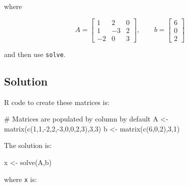 \documentclass[
  letterpaper,
]{book}
\newenvironment{Shaded}{\begin{snugshade}}{\end{snugshade}}
\newcommand{\CommentTok}[1]{\textcolor[rgb]{0.37,0.37,0.37}{#1}}
\newcommand{\DecValTok}[1]{\textcolor[rgb]{0.68,0.00,0.00}{#1}}
\newcommand{\FunctionTok}[1]{\textcolor[rgb]{0.28,0.35,0.67}{#1}}
\newcommand{\NormalTok}[1]{\textcolor[rgb]{0.00,0.23,0.31}{#1}}
\newcommand{\OtherTok}[1]{\textcolor[rgb]{0.00,0.23,0.31}{#1}}
\newcommand{\SpecialCharTok}[1]{\textcolor[rgb]{0.37,0.37,0.37}{#1}}
\begin{document}
where

\begin{equation*}
A = \left [ \begin{array}{rrr}
             1 &  2 & 0 \\
             1 & -3 & 2 \\
            -2 &  0 & 3
            \end{array} \right ], \qquad 
  b = \left[ \begin{matrix}6 \\ 0 \\ 2\end{matrix} \right ]
\end{equation*}

and then use \texttt{solve}.

\hypertarget{solution-1}{%
\subsection{Solution}\label{solution-1}}

R code to create these matrices is:

\begin{Shaded}
\begin{Highlighting}[]
\CommentTok{\# Matrices are populated by column by default}
\NormalTok{A }\OtherTok{\textless{}{-}} \FunctionTok{matrix}\NormalTok{(}\FunctionTok{c}\NormalTok{(}\DecValTok{1}\NormalTok{,}\DecValTok{1}\NormalTok{,}\SpecialCharTok{{-}}\DecValTok{2}\NormalTok{,}\DecValTok{2}\NormalTok{,}\SpecialCharTok{{-}}\DecValTok{3}\NormalTok{,}\DecValTok{0}\NormalTok{,}\DecValTok{0}\NormalTok{,}\DecValTok{2}\NormalTok{,}\DecValTok{3}\NormalTok{),}\DecValTok{3}\NormalTok{,}\DecValTok{3}\NormalTok{)}
\NormalTok{b }\OtherTok{\textless{}{-}} \FunctionTok{matrix}\NormalTok{(}\FunctionTok{c}\NormalTok{(}\DecValTok{6}\NormalTok{,}\DecValTok{0}\NormalTok{,}\DecValTok{2}\NormalTok{),}\DecValTok{3}\NormalTok{,}\DecValTok{1}\NormalTok{)}
\end{Highlighting}
\end{Shaded}

The solution is:

\begin{Shaded}
\begin{Highlighting}[]
\NormalTok{x }\OtherTok{\textless{}{-}} \FunctionTok{solve}\NormalTok{(A,b)}
\end{Highlighting}
\end{Shaded}

where \texttt{x} is:
\end{document}
